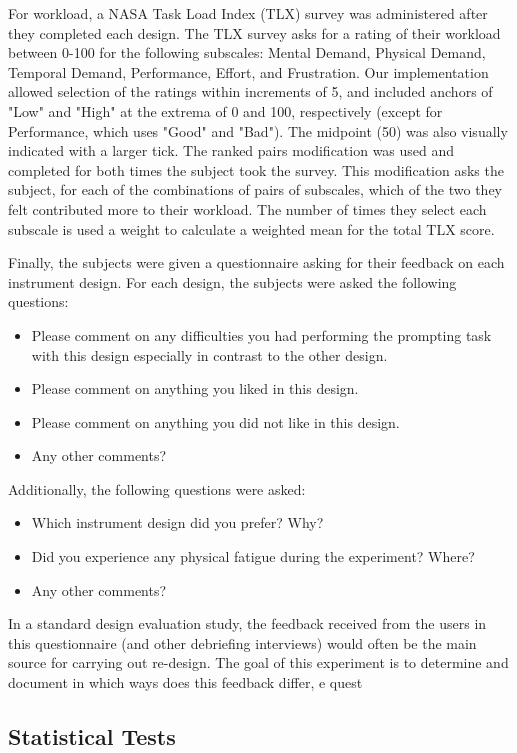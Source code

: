 For workload, a NASA Task Load Index (TLX) survey was administered after they completed each design.
The TLX survey asks for a rating of their workload between 0-100 for the following subscales: Mental Demand, Physical Demand, Temporal Demand, Performance, Effort, and Frustration.
Our implementation allowed selection of the ratings within increments of 5, and included anchors of "Low" and "High" at the extrema of 0 and 100, respectively (except for Performance, which uses "Good" and "Bad").
The midpoint (50) was also visually indicated with a larger tick.
The ranked pairs modification was used and completed for both times the subject took the survey.
This modification asks the subject, for each of the combinations of pairs of subscales, which of the two they felt contributed more to their workload.
The number of times they select each subscale is used a weight to calculate a weighted mean for the total TLX score.

Finally, the subjects were given a questionnaire asking for their feedback on each instrument design.
For each design, the subjects were asked the following questions:
\begin{itemize}
    \item Please comment on any difficulties you had performing the prompting task with this design especially in contrast to the other design.
    \item Please comment on anything you liked in this design.
    \item Please comment on anything you did not like in this design.
    \item Any other comments?
\end{itemize}
Additionally, the following questions were asked:
\begin{itemize}
    \item Which instrument design did you prefer? Why?
    \item Did you experience any physical fatigue during the experiment? Where?
    \item Any other comments?
\end{itemize}

In a standard design evaluation study, the feedback received from the users in this questionnaire (and other debriefing interviews) would often be the main source for carrying out re-design.
The goal of this experiment is to determine and document in which ways does this feedback differ, e quest

\subsection{Statistical Tests}

